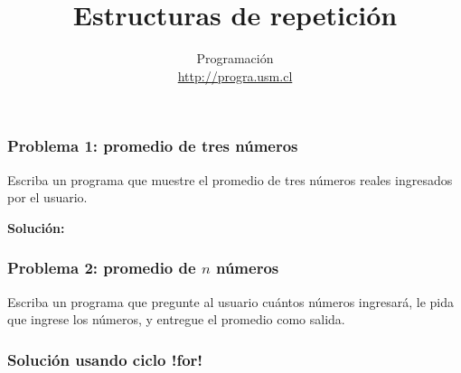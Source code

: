 \documentclass[12pt]{beamer}
\title{Estructuras de repetición}
\author{Programación \\ \url{http://progra.usm.cl}}
\date{}
\begin{document}
  \begin{frame}
    \maketitle
  \end{frame}

  \begin{frame}
    \frametitle{Problema 1: promedio de tres números}
    \label{problema-promedio-3-numeros}

    Escriba un programa que muestre el promedio de tres números reales
    ingresados por el usuario.
    
    

    \vfill
    \textbf{Solución:}
    
  \end{frame}
  

  \begin{frame}
    \frametitle{Problema 2: promedio de \(n\) números}
    \label{problema-promedio-n-numeros}

    Escriba un programa que pregunte al usuario
    cuántos números ingresará,
    le pida que ingrese los números,
    y entregue el promedio como salida.

    
  \end{frame}
  
  
  \begin{frame}
    \frametitle{Solución usando ciclo \li!for!}
    \label{solucion-promedio-n-numeros}

    
  \end{frame}
\end{document}
